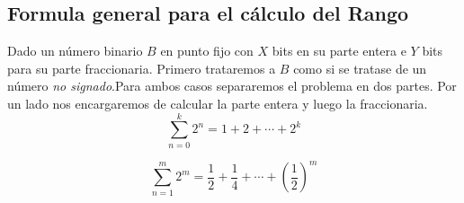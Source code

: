 \subsection{Formula general para el c\'alculo del Rango}
\indent Dado un n\'umero binario $B$ en punto fijo con $X$ bits en su parte entera e $Y$ bits para su parte fraccionaria. 
\indent Primero trataremos a $B$ como si se tratase de un n\'umero \textit{no signado}.Para ambos casos separaremos el problema en dos partes. Por un lado nos encargaremos de calcular la parte entera y luego la fraccionaria.
\\
$$\sum\limits_{n=0}^k 2^n = 1 + 2 +  \cdots  + 2^k$$


$$\sum\limits_{n=1}^m 2^m = \frac{1}{2} + \frac{1}{4} +  \cdots  + \left(\frac{1}{2}\right)^m$$
   




 
%


